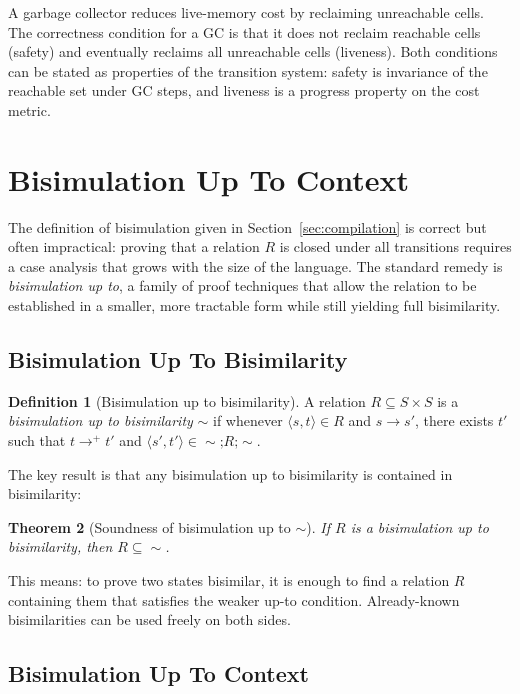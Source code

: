 \documentclass[11pt, a4paper]{article}
\theoremstyle{definition}
\newtheorem{definition}{Definition}[section]
\theoremstyle{plain}
\newtheorem{theorem}[definition]{Theorem}
\theoremstyle{remark}
\begin{document}
A garbage collector reduces live-memory cost by reclaiming unreachable cells.
The correctness condition for a GC is that it does not reclaim reachable
cells (safety) and eventually reclaims all unreachable cells (liveness).
Both conditions can be stated as properties of the transition system: safety
is invariance of the reachable set under GC steps, and liveness is a
progress property on the cost metric.



\section{Bisimulation Up To Context}
\label{sec:bisim-context}

The definition of bisimulation given in Section~\ref{sec:compilation} is
correct but often impractical: proving that a relation $R$ is closed under
all transitions requires a case analysis that grows with the size of the
language. The standard remedy is \emph{bisimulation up to}, a family of
proof techniques that allow the relation to be established in a smaller,
more tractable form while still yielding full bisimilarity.

\subsection{Bisimulation Up To Bisimilarity}

\begin{definition}[Bisimulation up to bisimilarity]
  A relation $R \subseteq S \times S$ is a \emph{bisimulation up to
  bisimilarity} $\mathord{\sim}$ if whenever $\langle s, t\rangle \in R$ and
  $s \to s'$, there exists $t'$ such that $t \to^{+} t'$ and
  $\langle s', t'\rangle \in {\sim} \mathbin{;} R \mathbin{;} {\sim}$.
\end{definition}

The key result \citep{sangiorgi1994} is that any bisimulation up to bisimilarity
is contained in bisimilarity:

\begin{theorem}[Soundness of bisimulation up to $\sim$]
  If $R$ is a bisimulation up to bisimilarity, then $R \subseteq {\sim}$.
\end{theorem}

This means: to prove two states bisimilar, it is enough to find a relation
$R$ containing them that satisfies the weaker up-to condition. Already-known
bisimilarities can be used freely on both sides.

\subsection{Bisimulation Up To Context}
\end{document}
